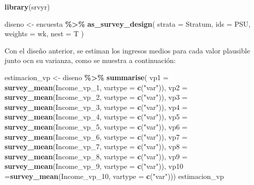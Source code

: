 \documentclass[
  spanish,
  12pt,
]{book}
\newenvironment{Shaded}{\begin{snugshade}}{\end{snugshade}}
\newcommand{\AttributeTok}[1]{\textcolor[rgb]{0.13,0.29,0.53}{#1}}
\newcommand{\FunctionTok}[1]{\textcolor[rgb]{0.13,0.29,0.53}{\textbf{#1}}}
\newcommand{\NormalTok}[1]{#1}
\newcommand{\OtherTok}[1]{\textcolor[rgb]{0.56,0.35,0.01}{#1}}
\newcommand{\SpecialCharTok}[1]{\textcolor[rgb]{0.81,0.36,0.00}{\textbf{#1}}}
\newcommand{\StringTok}[1]{\textcolor[rgb]{0.31,0.60,0.02}{#1}}
\begin{document}
\begin{Shaded}
\begin{Highlighting}[]
\FunctionTok{library}\NormalTok{(srvyr)}

\NormalTok{diseno }\OtherTok{\textless{}{-}}\NormalTok{ encuesta }\SpecialCharTok{\%\textgreater{}\%}
  \FunctionTok{as\_survey\_design}\NormalTok{(}
    \AttributeTok{strata =}\NormalTok{ Stratum,}
    \AttributeTok{ids =}\NormalTok{ PSU,}
    \AttributeTok{weights =}\NormalTok{ wk,}
    \AttributeTok{nest =}\NormalTok{ T}
\NormalTok{  )}
\end{Highlighting}
\end{Shaded}

Con el diseño anterior, se estiman los ingresos medios para cada valor plausible junto ocn su varianza, como se muestra a continuación:

\begin{Shaded}
\begin{Highlighting}[]
\NormalTok{estimacion\_vp }\OtherTok{\textless{}{-}}\NormalTok{  diseno }\SpecialCharTok{\%\textgreater{}\%} 
 \FunctionTok{summarise}\NormalTok{(}
   \AttributeTok{vp1 =} \FunctionTok{survey\_mean}\NormalTok{(Income\_vp\_1, }\AttributeTok{vartype =} \FunctionTok{c}\NormalTok{(}\StringTok{"var"}\NormalTok{)),}
   \AttributeTok{vp2 =} \FunctionTok{survey\_mean}\NormalTok{(Income\_vp\_2, }\AttributeTok{vartype =} \FunctionTok{c}\NormalTok{(}\StringTok{"var"}\NormalTok{)),}
   \AttributeTok{vp3 =} \FunctionTok{survey\_mean}\NormalTok{(Income\_vp\_3, }\AttributeTok{vartype =} \FunctionTok{c}\NormalTok{(}\StringTok{"var"}\NormalTok{)),}
   \AttributeTok{vp4 =} \FunctionTok{survey\_mean}\NormalTok{(Income\_vp\_4, }\AttributeTok{vartype =} \FunctionTok{c}\NormalTok{(}\StringTok{"var"}\NormalTok{)),}
   \AttributeTok{vp5 =} \FunctionTok{survey\_mean}\NormalTok{(Income\_vp\_5, }\AttributeTok{vartype =} \FunctionTok{c}\NormalTok{(}\StringTok{"var"}\NormalTok{)),}
   \AttributeTok{vp6 =} \FunctionTok{survey\_mean}\NormalTok{(Income\_vp\_6, }\AttributeTok{vartype =} \FunctionTok{c}\NormalTok{(}\StringTok{"var"}\NormalTok{)),}
   \AttributeTok{vp7 =} \FunctionTok{survey\_mean}\NormalTok{(Income\_vp\_7, }\AttributeTok{vartype =} \FunctionTok{c}\NormalTok{(}\StringTok{"var"}\NormalTok{)),}
   \AttributeTok{vp8 =} \FunctionTok{survey\_mean}\NormalTok{(Income\_vp\_8, }\AttributeTok{vartype =} \FunctionTok{c}\NormalTok{(}\StringTok{"var"}\NormalTok{)),}
   \AttributeTok{vp9 =} \FunctionTok{survey\_mean}\NormalTok{(Income\_vp\_9, }\AttributeTok{vartype =} \FunctionTok{c}\NormalTok{(}\StringTok{"var"}\NormalTok{)),}
   \AttributeTok{vp10 =}\FunctionTok{survey\_mean}\NormalTok{(Income\_vp\_10, }\AttributeTok{vartype =} \FunctionTok{c}\NormalTok{(}\StringTok{"var"}\NormalTok{)))}
\NormalTok{estimacion\_vp}
\end{Highlighting}
\end{Shaded}
\end{document}
